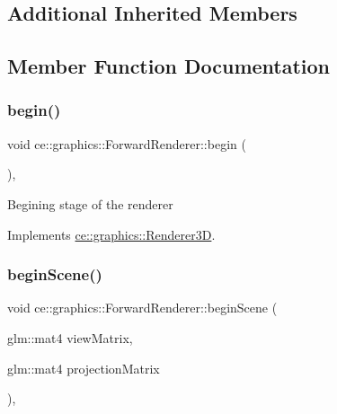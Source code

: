 \subsection*{Additional Inherited Members}


\subsection{Member Function Documentation}
\mbox{\label{classce_1_1graphics_1_1_forward_renderer_a4550120dc1349b5298de4a02422c6c26}} 
\subsubsection{\texorpdfstring{begin()}{begin()}}
{\footnotesize\ttfamily void ce\+::graphics\+::\+Forward\+Renderer\+::begin (\begin{DoxyParamCaption}{ }\end{DoxyParamCaption})\hspace{0.3cm}{\ttfamily [override]}, {\ttfamily [virtual]}}

Begining stage of the renderer 

Implements \hyperlink{classce_1_1graphics_1_1_renderer3_d_a51818b5b581c33001ddbbc6dff9d6e36}{ce\+::graphics\+::\+Renderer3D}.

\mbox{\label{classce_1_1graphics_1_1_forward_renderer_a218629cfc8ee0f776589956f12ce9441}} 
\subsubsection{\texorpdfstring{begin\+Scene()}{beginScene()}}
{\footnotesize\ttfamily void ce\+::graphics\+::\+Forward\+Renderer\+::begin\+Scene (\begin{DoxyParamCaption}\item[{glm\+::mat4}]{view\+Matrix,  }\item[{glm\+::mat4}]{projection\+Matrix }\end{DoxyParamCaption})\hspace{0.3cm}{\ttfamily [override]}, {\ttfamily [virtual]}}

